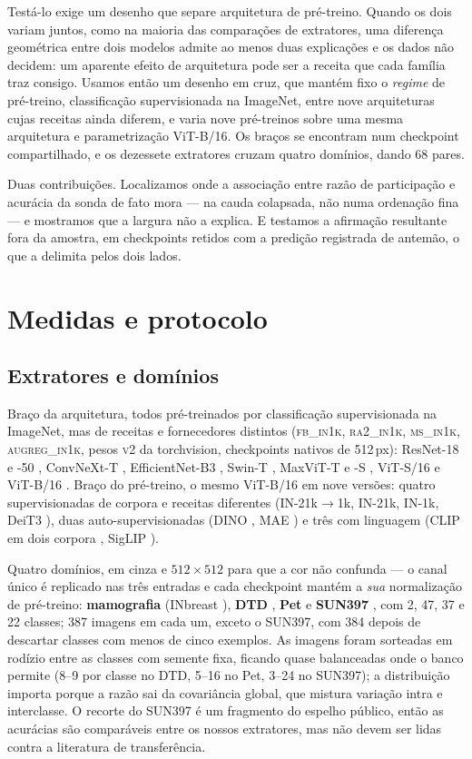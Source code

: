 \documentclass{esannV2}
\begin{document}
Testá-lo exige um desenho que separe arquitetura de pré-treino. Quando os dois
variam juntos, como na maioria das comparações de extratores, uma diferença
geométrica entre dois modelos admite ao menos duas explicações e os dados não
decidem: um aparente efeito de arquitetura pode ser a receita que cada família
traz consigo. Usamos então um desenho em cruz, que mantém fixo o \emph{regime} de
pré-treino, classificação supervisionada na ImageNet, entre nove arquiteturas
cujas receitas ainda diferem, e varia nove pré-treinos sobre uma mesma
arquitetura e parametrização ViT-B/16. Os braços se encontram num checkpoint
compartilhado, e os dezessete extratores cruzam quatro domínios, dando 68
pares.

Duas contribuições. Localizamos onde a associação entre razão de participação e
acurácia da sonda de fato mora --- na cauda colapsada, não numa ordenação fina
--- e mostramos que a largura não a explica. E testamos a afirmação resultante
fora da amostra, em checkpoints retidos com a predição registrada de antemão, o
que a delimita pelos dois lados.

\section{Medidas e protocolo}

\subsection{Extratores e domínios}

Braço da arquitetura, todos pré-treinados por classificação supervisionada na
ImageNet, mas de receitas e fornecedores distintos (\textsc{fb\_in1k},
\textsc{ra2\_in1k}, \textsc{ms\_in1k}, \textsc{augreg\_in1k}, pesos
\textsc{v2} da torchvision, checkpoints nativos de 512\,px): ResNet-18 e -50
\cite{ResNet}, ConvNeXt-T \cite{ConvNeXt}, EfficientNet-B3 \cite{EffNet},
Swin-T \cite{Swin}, MaxViT-T e -S \cite{MaxViT}, ViT-S/16 e ViT-B/16
\cite{ViT}. Braço do pré-treino, o mesmo ViT-B/16 em nove versões: quatro
supervisionadas de corpora e receitas diferentes (IN-21k$\to$1k, IN-21k, IN-1k,
DeiT3 \cite{DeiT3}), duas auto-supervisionadas (DINO \cite{DINO}, MAE
\cite{MAE}) e três com linguagem (CLIP em dois corpora \cite{CLIP}, SigLIP
\cite{SigLIP}).

Quatro domínios, em cinza e $512\times512$ para que a cor não confunda --- o
canal único é replicado nas três entradas e cada checkpoint mantém a
\emph{sua} normalização de pré-treino: \textbf{mamografia} (INbreast
\cite{INbreast}), \textbf{DTD} \cite{DTD}, \textbf{Pet} \cite{Pet} e
\textbf{SUN397} \cite{SUN397}, com 2, 47, 37 e 22 classes; 387 imagens em cada
um, exceto o SUN397, com 384 depois de descartar classes com menos de cinco
exemplos. As imagens foram sorteadas em rodízio entre as classes com semente
fixa, ficando quase balanceadas onde o banco permite (8--9 por classe no DTD,
5--16 no Pet, 3--24 no SUN397); a distribuição importa porque a razão sai da
covariância global, que mistura variação intra e interclasse. O recorte do
SUN397 é um fragmento do espelho público, então as acurácias são comparáveis
entre os nossos extratores, mas não devem ser lidas contra a literatura de
transferência.
\end{document}
